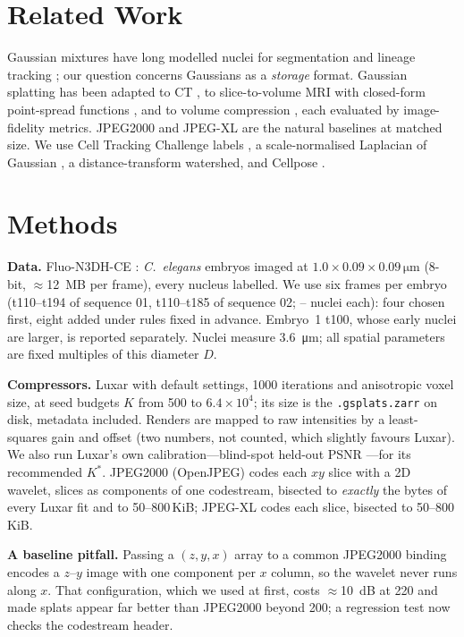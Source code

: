 \documentclass[conference]{IEEEtran}
\begin{document}
\section{Related Work}
Gaussian mixtures have long modelled nuclei for segmentation and lineage tracking
\cite{amat2014fast}; our question concerns Gaussians as a \emph{storage} format. Gaussian
splatting \cite{kerbl2023gaussian} has been adapted to CT \cite{zha2024r2gaussian,li2025threedgr},
to slice-to-volume MRI with closed-form point-spread functions \cite{dannecker2026fast}, and
to volume compression \cite{royer2026luxar,gaussianpile2026,gstoken2026,martin2026fixedbudget},
each evaluated by image-fidelity metrics. JPEG2000 \cite{taubman2002jpeg2000} and JPEG-XL
\cite{alakuijala2019jpegxl} are the natural baselines at matched size. We use Cell Tracking
Challenge labels \cite{ulman2017objective,maska2023cell}, a scale-normalised Laplacian of
Gaussian \cite{lindeberg1998feature}, a distance-transform watershed, and Cellpose
\cite{stringer2021cellpose}.

\section{Methods}
\textbf{Data.} Fluo-N3DH-CE \cite{maska2023cell}: \emph{C.~elegans} embryos imaged at
$1.0\times0.09\times0.09\,\si{\micro\meter}$ (8-bit, $\approx$\SI{12}{MB} per frame), every
nucleus labelled. We use six frames per embryo (t110--t194 of sequence 01, t110--t185 of
sequence 02; \NlabMin--\NlabMax{} nuclei each): four chosen first, eight added under rules
fixed in advance. Embryo~1 t100, whose early nuclei are larger, is reported separately.
Nuclei measure \SI{3.6}{\micro\meter}; all spatial parameters are fixed multiples of this
diameter $D$.

\textbf{Compressors.} Luxar \cite{royer2026luxar} with default settings, 1000 iterations and
anisotropic voxel size, at seed budgets $K$ from 500 to $6.4\times10^4$; its size is the
\texttt{.gsplats.zarr} on disk, metadata included. Renders are mapped to raw intensities by a
least-squares gain and offset (two numbers, not counted, which slightly favours Luxar). We also
run Luxar's own calibration---blind-spot held-out PSNR \cite{batson2019noise2self}---for its
recommended $K^\ast$. JPEG2000 (OpenJPEG) codes each $xy$ slice with a 2D wavelet, slices as
components of one codestream, bisected to \emph{exactly} the bytes of every Luxar fit and to
50--800\,KiB; JPEG-XL codes each slice, bisected to 50--800\,KiB.

\textbf{A baseline pitfall.} Passing a $(z,y,x)$ array to a common JPEG2000 binding encodes a
$z$--$y$ image with one component per $x$ column, so the wavelet never runs along $x$. That
configuration, which we used at first, costs $\approx$\SI{10}{dB} at \SI{220}{\times} and made
splats appear far better than JPEG2000 beyond \SI{200}{\times}; a regression test now checks
the codestream header.
\end{document}
